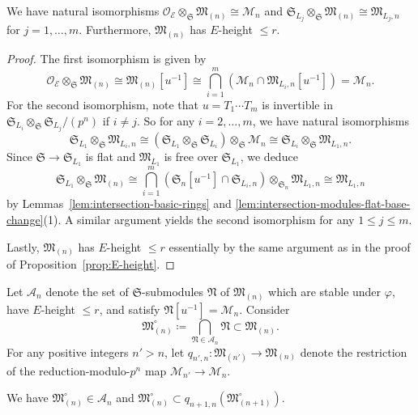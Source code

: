 \begin{lem}
We have natural isomorphisms $\mathcal{O}_{\mathcal{E}}\otimes_{\mathfrak{S}} \mathfrak{M}_{(n)}  \cong \mathcal{M}_n$ and $\mathfrak{S}_{L_j}\otimes_{\mathfrak{S}} \mathfrak{M}_{(n)} \cong \mathfrak{M}_{L_j, n}$ for $j = 1, \ldots, m$. Furthermore, $\mathfrak{M}_{(n)}$ has $E$-height $\leq r$.
\end{lem}

\begin{proof}
The first isomorphism is given by
\[
\mathcal{O}_{\mathcal{E}}\otimes_{\mathfrak{S}}\mathfrak{M}_{(n)} \cong \mathfrak{M}_{(n)}[u^{-1}] \cong \bigcap_{i=1}^m (\mathcal{M}_n \cap \mathfrak{M}_{L_i, n}[u^{-1}]) = \mathcal{M}_n.
\]
For the second isomorphism, note that $u = T_1\cdots T_m$ is invertible in $\mathfrak{S}_{L_i}\otimes_{\mathfrak{S}} \mathfrak{S}_{L_j} / (p^n)$ if $i \neq j$. So for any $i = 2, \ldots, m$, we have natural isomorphisms
\[
\mathfrak{S}_{L_1}\otimes_{\mathfrak{S}} \mathfrak{M}_{L_i, n} \cong (\mathfrak{S}_{L_1}\otimes_{\mathfrak{S}} \mathfrak{S}_{L_i})\otimes_{\mathfrak{S}} \mathcal{M}_n \cong \mathfrak{S}_{L_i}\otimes_{\mathfrak{S}} \mathfrak{M}_{L_1, n}.
\]
Since $\mathfrak{S} \rightarrow \mathfrak{S}_{L_1}$ is flat and $\mathfrak{M}_{L_1}$ is free over $\mathfrak{S}_{L_1}$, we deduce
\[
\mathfrak{S}_{L_1}\otimes_{\mathfrak{S}} \mathfrak{M}_{(n)} \cong \bigcap_{i=1}^m (\mathfrak{S}_n[u^{-1}] \cap \mathfrak{S}_{L_i, n}) \otimes_{\mathfrak{S}_n} \mathfrak{M}_{L_1, n} \cong \mathfrak{M}_{L_1, n}
\]
by Lemmas~\ref{lem:intersection-basic-rings} and \ref{lem:intersection-modules-flat-base-change}(1). A similar argument yields the second isomorphism for any $1 \leq j \leq m$.

Lastly, $\mathfrak{M}_{(n)}$ has $E$-height $\leq r$ essentially by the same argument as in the proof of Proposition~\ref{prop:E-height}.
\end{proof}

Let $\mathscr{A}_n$ denote the set of $\mathfrak{S}$-submodules $\mathfrak{N}$ of $\mathfrak{M}_{(n)}$ which are stable under $\varphi$, have $E$-height $\leq r$, and satisfy $\mathfrak{N}[u^{-1}] = \mathcal{M}_n$. Consider
\[
\mathfrak{M}_{(n)}^{\circ} \coloneqq \bigcap_{\mathfrak{N} \in \mathscr{A}_n} \mathfrak{N} \subset \mathfrak{M}_{(n)}.
\]
For any positive integers $n' > n$, let $q_{n',n}\colon \mathfrak{M}_{(n')} \rightarrow \mathfrak{M} _{(n)}$ denote the restriction of the reduction-modulo-$p^n$ map $\mathcal{M}_{n'} \rightarrow \mathcal{M}_n$.


\begin{lem} \label{lem:intersection-A_n}
We have $\mathfrak{M}_{(n)}^{\circ} \in \mathscr{A}_n$ and $\mathfrak{M}_{(n)}^{\circ} \subset q_{n+1, n}(\mathfrak{M}_{(n+1)}^{\circ})$.
\end{lem}

